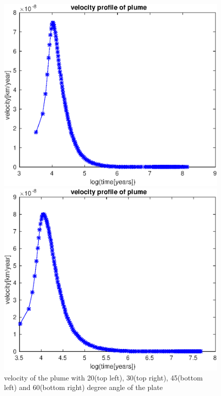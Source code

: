 \documentclass[12pt]{scrreprt}
\begin{document}
\begin{figure}[ht!]
\begin{minipage}[t]{1.0\textwidth}
\begin{minipage}[t]{0.5\textwidth}
		\end{minipage}
	\end{minipage}
	\begin{minipage}[t]{1.0\textwidth}	
		\begin{minipage}[t]{0.5\textwidth}
		\includegraphics[width=1.0\textwidth]{./Snapshots/ref/Subductionzonewithblobposrefslab45s2e7s2e7r20velocity.eps}
		\end{minipage}
		\begin{minipage}[t]{0.5\textwidth}
		\includegraphics[width=1.0\textwidth]{./Snapshots/ref/Subductionzonewithblobposrefslab60s2e7s2e7r20velocity.eps}
		\end{minipage}
	\end{minipage}
	\caption{velocity of the plume with 20(top left), 30(top right), 45(bottom left) and 60(bottom right) degree angle of the plate}
	\label{fig:velocityinitial}
\end{figure}
\end{document}
